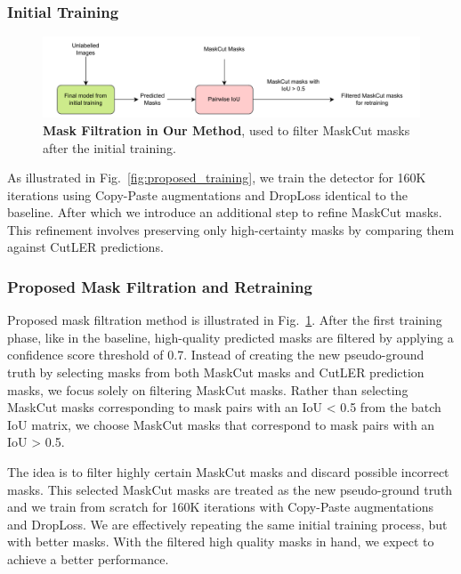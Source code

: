 \subsubsection{Initial Training}
\begin{figure}
	\centering
	\includegraphics[width=1\textwidth]{Images/main/our_mask_filtration_1.pdf}
	\caption[\textbf{Mask Filtration in Proposed Method}]{\textbf{Mask Filtration in Our Method}, used to filter MaskCut masks after the initial training.}
	\label{fig:our_mask_filtration}
\end{figure}

As illustrated in Fig.~\ref{fig:proposed_training}, we train the detector for 160K iterations using Copy-Paste augmentations and DropLoss identical to the baseline. After which we introduce an additional step to refine MaskCut masks. This refinement involves preserving only high-certainty masks by comparing them against CutLER predictions.

\subsubsection{Proposed Mask Filtration and Retraining}
Proposed mask filtration method is illustrated in Fig.~\ref{fig:our_mask_filtration}. After the first training phase, like in the baseline, high-quality predicted masks are filtered by applying a confidence score threshold of 0.7.  Instead of creating the new pseudo-ground truth by selecting masks from both MaskCut masks and CutLER prediction masks, we focus solely on filtering MaskCut masks. Rather than selecting MaskCut masks corresponding to mask pairs with an IoU < 0.5 from the batch IoU matrix, we choose MaskCut masks that correspond to mask pairs with an IoU > 0.5. 

The idea is to filter highly certain MaskCut masks and discard possible incorrect masks. This selected MaskCut masks are treated as the new pseudo-ground truth and we train from scratch for 160K iterations with Copy-Paste augmentations and DropLoss. We are effectively repeating the same initial training process, but with better masks. With the filtered high quality masks in hand, we expect to achieve a better performance. 

